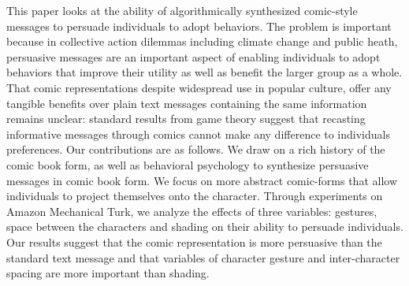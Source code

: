 
This paper looks at the ability of algorithmically synthesized comic-style messages to persuade individuals to adopt behaviors. The problem is important because in collective action dilemmas including climate change and public heath, persuasive messages are an important aspect of enabling individuals to adopt behaviors that improve their utility as well as benefit the larger group as a whole. That comic representations despite widespread use in popular culture, offer any tangible benefits over plain text messages containing the same information remains unclear: standard results from game theory suggest that recasting informative messages through comics cannot make any difference to individuals preferences. Our contributions are as follows. We draw on a rich history of the comic book form, as well as behavioral psychology to synthesize persuasive messages in comic book form. We focus on more abstract comic-forms that allow individuals to project themselves onto the character. Through  experiments on Amazon Mechanical Turk, we analyze the effects of three variables: gestures, space between the characters and shading on their ability to persuade individuals. Our results suggest that the comic representation is more persuasive than the standard text message and that variables of character gesture and inter-character spacing are more important than shading.
